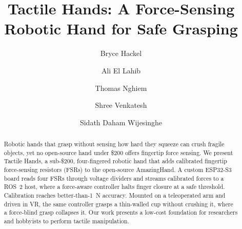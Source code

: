 \documentclass[acmlarge,screen,nonacm]{acmart}
\begin{document}
\title{Tactile Hands: A Force-Sensing Robotic Hand for Safe Grasping}

\author{Bryce Hackel}

\author{Ali El Lahib}

\author{Thomas Nghiem}

\author{Shree Venkatesh}

\author{Sidath Daham Wijesinghe}

\renewcommand{\shortauthors}{Triton Droids: Tactile Hands}

\begin{abstract}
Robotic hands that grasp without sensing how hard they squeeze can crush
fragile objects, yet no open-source hand under \$200 offers fingertip force
sensing. We present Tactile Hands, a sub-\$200, four-fingered robotic hand that
adds calibrated fingertip force-sensing resistors (FSRs) to the open-source
AmazingHand. A custom ESP32-S3 board reads four FSRs through voltage dividers
and streams calibrated forces to a ROS~2 host, where a force-aware controller
halts finger closure at a safe threshold. Calibration reaches better-than-1~N
accuracy. Mounted on a teleoperated arm and driven in VR, the same controller
grasps a thin-walled cup without crushing it, where a force-blind grasp collapses
it. Our work presents a low-cost foundation for researchers and hobbyists to perform tactile manipulation.
\end{abstract}


\maketitle
\end{document}
